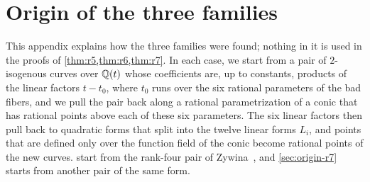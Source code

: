 \chapter{Origin of the three families}\label{app:origins}

This appendix explains how the three families were found; nothing in it is used in the proofs of \cref{thm:r5,thm:r6,thm:r7}. In each case, we start from a pair of $2$-isogenous curves over $\mathbb Q(t)$ whose coefficients are, up to constants, products of the linear factors $t-t_0$, where $t_0$ runs over the six rational parameters of the bad fibers, and we pull the pair back along a rational parametrization of a conic that has rational points above each of these six parameters. The six linear factors then pull back to quadratic forms that split into the twelve linear forms $L_i$, and points that are defined only over the function field of the conic become rational points of the new curves.  start from the rank-four pair of Zywina~\cite[\S6.5]{Zywina2026}, and \cref{sec:origin-r7} starts from another pair of the same form.




